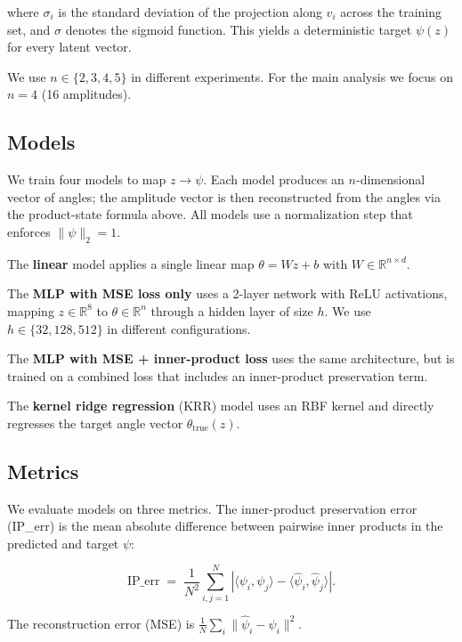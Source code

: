 \documentclass[11pt]{article}
\begin{document}
where $\sigma_{i}$ is the standard deviation of the projection along $v_{i}$
across the training set, and $\sigma$ denotes the sigmoid function. This
yields a deterministic target $\psi(z)$ for every latent vector.

We use $n \in \{2, 3, 4, 5\}$ in different experiments. For the main
analysis we focus on $n = 4$ (16 amplitudes).

\subsection{Models}

We train four models to map $z \to \psi$. Each model produces an
$n$-dimensional vector of angles; the amplitude vector is then reconstructed
from the angles via the product-state formula above. All models use a
normalization step that enforces $\|\psi\|_{2} = 1$.

The \textbf{linear} model applies a single linear map
$\theta = W z + b$ with $W \in \mathbb{R}^{n \times d}$.

The \textbf{MLP with MSE loss only} uses a 2-layer network with ReLU
activations, mapping $z \in \mathbb{R}^{8}$ to $\theta \in \mathbb{R}^{n}$
through a hidden layer of size $h$. We use $h \in \{32, 128, 512\}$ in
different configurations.

The \textbf{MLP with MSE + inner-product loss} uses the same architecture,
but is trained on a combined loss that includes an inner-product
preservation term.

The \textbf{kernel ridge regression} (KRR) model uses an RBF kernel and
directly regresses the target angle vector $\theta_{\text{true}}(z)$.

\subsection{Metrics}

We evaluate models on three metrics. The inner-product preservation error
(IP\_err) is the mean absolute difference between pairwise inner products
in the predicted and target $\psi$:

\begin{equation}
\text{IP\_err}
\;=\; \frac{1}{N^{2}} \sum_{i,j=1}^{N}
    \left| \langle \psi_{i}, \psi_{j} \rangle
        - \langle \hat{\psi}_{i}, \hat{\psi}_{j} \rangle \right|.
\end{equation}

The reconstruction error (MSE) is
$\frac{1}{N} \sum_{i} \|\hat{\psi}_{i} - \psi_{i}\|^{2}$.
\end{document}
